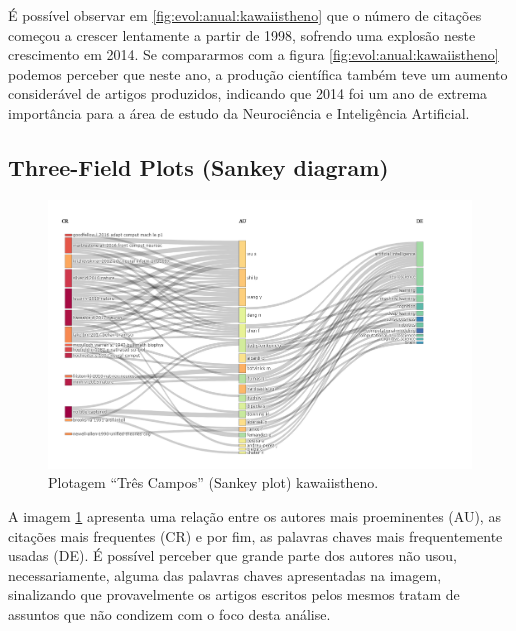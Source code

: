 É possível observar em \ref{fig:evol:anual:kawaiistheno} que o número de citações começou a crescer lentamente a partir de 1998, sofrendo uma explosão neste crescimento em 2014. Se compararmos com a figura \ref{fig:evol:anual:kawaiistheno} podemos perceber que neste ano, a produção científica também teve um aumento considerável de artigos produzidos, indicando que 2014 foi um ano de extrema importância para a área de estudo da Neurociência e Inteligência Artificial.

\subsection{Three-Field Plots (Sankey diagram)}

\begin{figure}
    \centering
    \includegraphics[width=1\textwidth]{experiments/KawaiiStheno/PesqBibliogr/NeurocienciaIIA/WoS-20220206/threeFieldsPlot.png}
    \caption{Plotagem ``Três Campos'' (Sankey plot) kawaiistheno.}
    \label{fig:three:fields:kawaiistheno}
\end{figure}

A imagem \ref{fig:three:fields:kawaiistheno} apresenta uma relação entre os autores mais proeminentes (AU), as citações mais frequentes (CR) e por fim, as palavras chaves mais frequentemente usadas (DE). É possível perceber que grande parte dos autores não usou, necessariamente, alguma das palavras chaves apresentadas na imagem, sinalizando que provavelmente os artigos escritos pelos mesmos tratam de assuntos que não condizem com o foco desta análise.